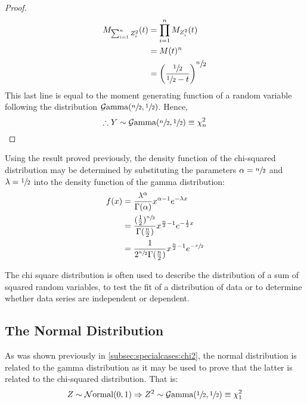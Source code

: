 \documentclass[12pt]{article}
\newcommand{\G}{\mathcal{G}}
\newcommand{\N}{\mathcal{N}}
\begin{document}
\begin{proof}
\begin{equation}
		\begin{split}
			M_{\sum^n_{i=1}Z^2_i}(t)	&=	\prod^n_{i=1}M_{Z^2_i}(t)\\
										&=	M(t)^n\\
										&=	\left(\frac{\sfrac{1}{2}}{\sfrac{1}{2}-t}\right)^{\displaystyle\sfrac{n}{2}}
		\end{split}
	\end{equation}
	This last line is equal to the moment generating function of a random variable following the distribution
	$\G\text{amma}(\sfrac{n}{2}, \sfrac{1}{2})$. Hence,
	\begin{equation}
		\therefore Y\sim\G\text{amma}(\sfrac{n}{2}, \sfrac{1}{2})\equiv \chi^2_n
	\end{equation}
\end{proof}

Using the result proved previously, the density function of the chi-squared distribution may be determined by
substituting the parameters $\alpha = \sfrac{n}{2}$ and $\lambda = \sfrac{1}{2}$ into the density function of the gamma
distribution:
\begin{equation}\label{eq:chisquared-density}
	\begin{split}
		f(x)	&=	\frac{\lambda^\alpha}{\Gamma(\alpha)}x^{\alpha-1}e^{-\lambda x}\\
				&=	\frac{(\frac{1}{2})^{\sfrac{n}{2}}}{\Gamma(\frac{n}{2})}x^{\frac{n}{2}-1}e^{-\frac{1}{2}x}\\
				&=	\frac{1}{2^{\sfrac{n}{2}}\Gamma(\frac{n}{2})}x^{\frac{n}{2}-1}e^{-\sfrac{x}{2}}
	\end{split}
\end{equation}

The chi square distribution is often used to describe the distribution of a sum of squared random variables, to test the
fit of a distribution of data or to determine whether data series are independent or dependent.


\pagebreak
\subsection{The Normal Distribution}\label{subsec:specialcases:normal}
As was shown previously in \autoref{subsec:specialcases:chi2}, the normal distribution is related to the gamma
distribution as it may be used to prove that the latter is related to the chi-squared distribution. That is:
\begin{equation}
	Z\sim\N\text{ormal}(0, 1)\Rightarrow Z^2\sim\G\text{amma}(\sfrac{1}{2}, \sfrac{1}{2})\equiv\chi^2_1
\end{equation}
\end{document}
